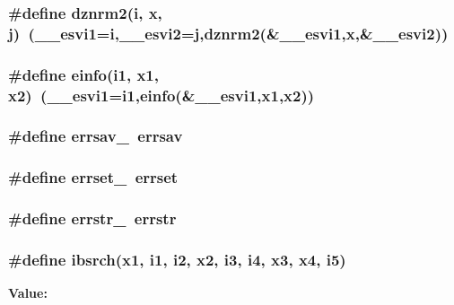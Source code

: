 \subsubsection{\setlength{\rightskip}{0pt plus 5cm}\#define dznrm2(i, x, j)~({\bf \_\-\_\-esvi1}=i,{\bf \_\-\_\-esvi2}=j,dznrm2(\&{\bf \_\-\_\-esvi1},x,\&{\bf \_\-\_\-esvi2}))}\label{essl_8h_fb87d2017a9fa3d5d7ce9225b56eadb2}


\subsubsection{\setlength{\rightskip}{0pt plus 5cm}\#define einfo(i1, x1, x2)~({\bf \_\-\_\-esvi1}=i1,einfo(\&{\bf \_\-\_\-esvi1},x1,x2))}\label{essl_8h_a4021e6da0a7e2becd1aaebdcef7c8f1}


\subsubsection{\setlength{\rightskip}{0pt plus 5cm}\#define errsav\_\-~errsav}\label{essl_8h_9a4538e61995a1e08c18bb0b4078d185}


\subsubsection{\setlength{\rightskip}{0pt plus 5cm}\#define errset\_\-~errset}\label{essl_8h_0c4a7b17d22fcdd7e0535afc124ad874}


\subsubsection{\setlength{\rightskip}{0pt plus 5cm}\#define errstr\_\-~errstr}\label{essl_8h_cd62ed1eed351952f78b3863b889e8bb}


\subsubsection{\setlength{\rightskip}{0pt plus 5cm}\#define ibsrch(x1, i1, i2, x2, i3, i4, x3, x4, i5)}\label{essl_8h_4f2b5971ceb83bb7287d68bdd7d4d47e}


{\bf Value:}

